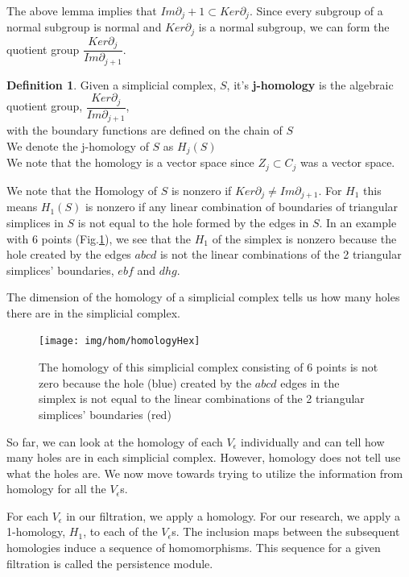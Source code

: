 \documentclass[12pt, a4paper, twocolumn, fullpage]{article}
\theoremstyle{plain}
\theoremstyle{definition}
\newtheorem{defn}{Definition}[section]
\theoremstyle{remark}
\begin{document}
The above lemma implies that $Im \partial_j+1 \subset Ker \partial _j$. Since every subgroup of a normal subgroup is normal and $Ker \partial _j$ is a normal subgroup, we can form the quotient group $\dfrac{Ker \partial _j}{Im \partial_{j+1}}$.


\begin{defn}
Given a simplicial complex, $S$, it's \textbf{j-homology} is the algebraic quotient group, $\dfrac{Ker \partial _j}{Im \partial_{j+1}}$,\\
with the boundary functions are defined on the chain of $S$\\
We denote the j-homology of $S$ as $H_j(S)$\\
We note that the homology is a vector space since $Z_j \subset C_j$ was a vector space.
\end{defn}

We note that the Homology of $S$ is nonzero if $Ker \partial _j \neq Im \partial_{j+1}$. For $H_1$ this means $H_1(S)$ is nonzero if any linear combination of boundaries of triangular simplices in $S$ is not equal to the hole formed by the edges in $S$. In an example with 6 points (Fig.\ref{homHex}), we see that the $H_1$ of the simplex is nonzero because the hole created by the edges $abcd$ is not the linear combinations of the 2 triangular simplices' boundaries, $ebf$ and $dhg$.

The dimension of the homology of a simplicial complex tells us how many holes there are in the simplicial complex.

\begin{figure}
    \texttt{[image: img/hom/homologyHex]}
    \caption{The homology of this simplicial complex consisting of 6 points is not zero because the hole (blue) created by the $abcd$ edges in the simplex is not equal to the linear combinations of the 2 triangular simplices'  boundaries (red) }
    \label{homHex}
\end{figure}

So far, we can look at the homology of each $V_{\epsilon}$ individually and can tell how many holes are in each simplicial complex. However, homology does not tell use what the holes are. We now move towards trying to utilize the information from homology for all the  $V_{\epsilon}$s.

For each $V_{\epsilon}$ in our filtration, we apply a homology. For our research, we apply a 1-homology, $H_1$, to each of the $V_{\epsilon}$s. The inclusion maps between the subsequent homologies induce a sequence of homomorphisms. This sequence for a given filtration is called the persistence module.
 
\end{document}
